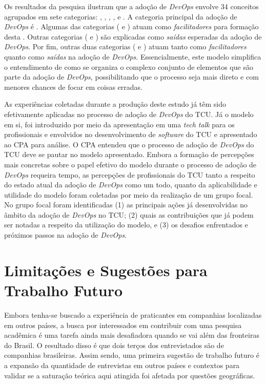 Os resultados da pesquisa ilustram que a adoção de {\it DevOps} envolve 34
conceitos agrupados em sete categorias: , ,
 \cc, ,
 e . A categoria principal da adoção de
{\it DevOps} é \cc. Algumas das categorias ( e ) atuam como \emph{facilitadores} para formação desta \cc.
Outras categorias ( e ) são explicadas como
\emph{saídas} esperadas da adoção de {\it DevOps}. Por fim, outras duas
categorias ( e ) atuam tanto
como \emph{facilitadores} quanto como \emph{saídas} na adoção de {\it DevOps}.
Essencialmente, este modelo simplifica o entendimento de como se organiza o
complexo conjunto de elementos que são parte da adoção de {\it DevOps},
possibilitando que o processo seja mais direto e com menores chances de focar
em coisas erradas.

As experiências coletadas durante a produção deste estudo já têm sido
efetivamente aplicadas no processo de adoção de {\it DevOps} do \acrshort{TCU}.
Já o modelo em si, foi introduzido por meio da apresentação em uma {\it tech talk}
para os profissionais e envolvidos no desenvolvimento de {\it software} do \acrshort{TCU}
e apresentado ao \acrshort{CPA} para análise. O \acrshort{CPA} entendeu que o
processo de adoção de {\it DevOps} do \acrshort{TCU} deve se pautar no modelo apresentado.
Embora a formação de percepções mais concretas sobre o papel efetivo do modelo
durante o processo de adoção de {\it DevOps} requeira tempo, as percepções de
profissionais do \acrshort{TCU} tanto a respeito do estado atual da adoção de
{\it DevOps} como um todo, quanto da aplicabilidade e utilidade do modelo foram
coletadas por meio da realização de um grupo focal. No grupo focal foram
identificadas (1) as principais ações já desenvolvidas no âmbito da adoção de
{\it DevOps} no \acrshort{TCU}; (2) quais as contribuições que já podem ser
notadas a respeito da utilização do modelo, e (3) os desafios enfrentados e
próximos passos na adoção de {\it DevOps}.

\section{Limitações e Sugestões para Trabalho Futuro}\label{limitacoes}

Embora tenha-se buscado a experiência de praticantes em companhias localizadas
em outros países, a busca por interessados em contribuir com uma pesquisa
acadêmica é uma tarefa ainda mais desafiadora quando se vai além das fronteiras
do Brasil. O resultado disso é que dois terços dos entrevistados são de
companhias brasileiras. Assim sendo, uma primeira sugestão de trabalho
futuro é a expansão da quantidade de entrevistas em outros países e contextos
para validar se a saturação teórica aqui atingida foi afetada por questões
geográficas.

